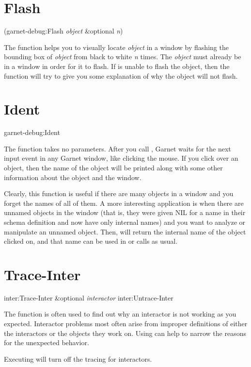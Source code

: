 \section{Flash}

\begin{programexample}
  (garnet-debug:Flash {\it object} \&optional {\it n})
\end{programexample}

The function 
helps you to visually locate {\it object} in a window by flashing the bounding
box of {\it object} from black to white {\it n} times.  The {\it object} must
already be in a window in order for it to flash.  If  is unable
to flash the object, then the function will try to give you some explanation
of why the object will not flash.


\section{Ident}

\begin{programexample}
garnet-debug:Ident
\end{programexample}

The function  takes no parameters.  After you call ,
Garnet waits for the next input event in any Garnet window,
like clicking the mouse.  If you click
over an object, then the name of the object will be printed along with
some other information about the object and the window.

Clearly, this function is useful if there are many objects in a window
and you forget the names of all of them.  A more interesting application is
when there are unnamed objects in the window (that is, they were given
NIL for a name in their schema definition and now have only internal names)
and you want to analyze or manipulate an unnamed object.  Then, 
will return the internal name of the object clicked on, and that name can
be used in  or  calls as usual.


\section{Trace-Inter}
\label{trace-inter}

\begin{programexample}
inter:Trace-Inter \&optional {\it interactor}\value{function}
inter:Untrace-Inter\value{function}
\end{programexample}

The function  is often used to find out why an
interactor is not working
as you expected.  Interactor problems most often arise from improper
definitions of either the interactors or the objects they work on.
Using  can help to narrow the reasons for the unexpected
behavior.

Executing  will turn off the tracing for interactors.



